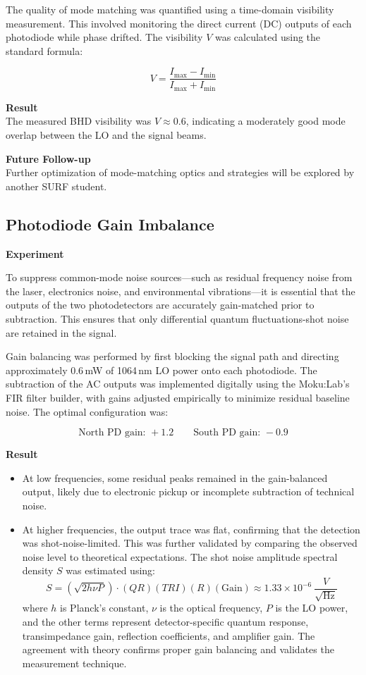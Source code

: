 \documentclass[colorlinks=true,pdfstartview=FitV,linkcolor=blue,
citecolor=red,urlcolor=magenta]{ligodoc}
\begin{document}
The quality of mode matching was quantified using a time-domain visibility measurement. This involved monitoring the direct current (DC) outputs of each photodiode while phase drifted. The visibility \( V \) was calculated using the standard formula:

\[
V = \frac{I_{\text{max}} - I_{\text{min}}}{I_{\text{max}} + I_{\text{min}}}
\]

\textbf{Result} \\
The measured BHD visibility was \( V \approx 0.6 \), indicating a moderately good mode overlap between the LO and the signal beams.

\textbf{Future Follow-up} \\
Further optimization of mode-matching optics and strategies will be explored by another SURF student.
\vspace{1em}

\subsection{Photodiode Gain Imbalance}
\textbf{Experiment}

To suppress common-mode noise sources—such as residual frequency noise from the laser, electronics noise, and environmental vibrations—it is essential that the outputs of the two photodetectors are accurately gain-matched prior to subtraction. This ensures that only differential quantum fluctuations-shot noise are retained in the signal.

Gain balancing was performed by first blocking the signal path and directing approximately 0.6\,mW of 1064\,nm LO power onto each photodiode. The subtraction of the AC outputs was implemented digitally using the Moku:Lab’s FIR filter builder, with gains adjusted empirically to minimize residual baseline noise. The optimal configuration was:

\[
\text{North PD gain: } +1.2 \qquad \text{South PD gain: } -0.9
\]

\textbf{Result} \\
\begin{itemize}
    \item At low frequencies, some residual peaks remained in the gain-balanced output, likely due to electronic pickup or incomplete subtraction of technical noise.
    \item At higher frequencies, the output trace was flat, confirming that the detection was shot-noise-limited. This was further validated by comparing the observed noise level to theoretical expectations. The shot noise amplitude spectral density \( S \) was estimated using:
    \[
    S = \left( \sqrt{2 h \nu P} \right) \cdot (QR)(TRI)(R)(\text{Gain}) \approx 1.33 \times 10^{-6}~\frac{V}{\sqrt{\text{Hz}}}
    \]
    where \( h \) is Planck’s constant, \( \nu \) is the optical frequency, \( P \) is the LO power, and the other terms represent detector-specific quantum response, transimpedance gain, reflection coefficients, and amplifier gain. The agreement with theory confirms proper gain balancing and validates the measurement technique.
\end{itemize}
\end{document}

